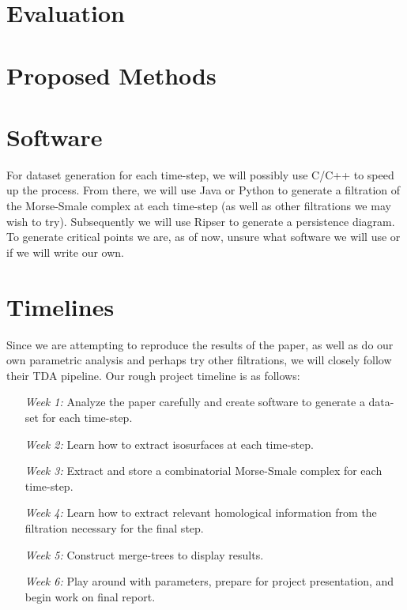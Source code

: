 \documentclass[12pt, fullpage,letterpaper]{article}
\begin{document}
	\section*{\normalfont Evaluation}  
	
	
	
	\section*{\normalfont Proposed Methods}  

	\section*{\normalfont Software}  
	
	For dataset generation for each time-step, we will possibly use C/C++ to speed up the process. From there, we will use Java or Python to generate a filtration of the Morse-Smale complex at each time-step (as well as other filtrations we may wish to try). Subsequently we will use Ripser to generate a persistence diagram. To generate critical points we are, as of now, unsure what software we will use or if we will write our own.
	
	\section*{\normalfont Timelines}  

	Since we are attempting to reproduce the results of the paper, as well as do our own parametric analysis and perhaps try other filtrations, we will closely follow their TDA pipeline. Our rough project timeline is as follows:
	\begin{enumerate}
		\item[{\textit{Week 1:}}] 
		Analyze the paper carefully and create software to generate a data-set for each time-step.
		\item[{\textit{Week 2:}}] 
		Learn how to extract isosurfaces at each time-step.
		\item[{\textit{Week 3:}}] 
		Extract and store a combinatorial Morse-Smale complex for each time-step.
		\item[{\textit{Week 4:}}] 
		Learn how to extract relevant homological information from the filtration necessary for the final step.
		\item[{\textit{Week 5:}}]  
		Construct merge-trees to display results.
		\item[{\textit{Week 6:}}] 
		Play around with parameters, prepare for project presentation, and begin work on final report. 
	\end{enumerate}  
\end{document}
